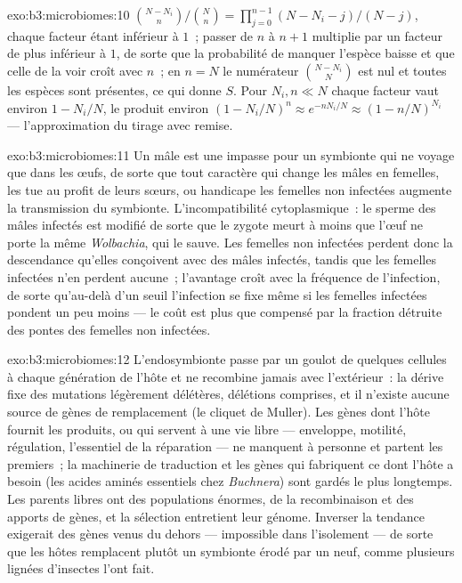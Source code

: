 \begin{solution}{exo:b3:microbiomes:10}
$\binom{N-N_{i}}{n}/\binom{N}{n} = \prod_{j=0}^{n-1}(N - N_{i} - j)/(N -
j)$, chaque facteur étant inférieur à $1$~; passer de $n$ à $n + 1$
multiplie par un facteur de plus inférieur à $1$, de sorte que la
probabilité de manquer l'espèce baisse et que celle de la voir croît
avec $n$~; en $n = N$ le numérateur $\binom{N -
N_{i}}{N}$ est nul et toutes les espèces sont présentes, ce qui donne
$S$. Pour $N_{i},
n \ll N$ chaque facteur vaut environ $1 - N_{i}/N$, le produit environ
$(1 -
N_{i}/N)^{n} \approx e^{-nN_{i}/N} \approx (1 - n/N)^{N_{i}}$ ---
l'approximation du tirage avec remise.
\end{solution}

\begin{solution}{exo:b3:microbiomes:11}
Un mâle est une impasse pour un symbionte qui ne voyage que dans les
œufs, de sorte que tout caractère qui change les mâles en femelles, les
tue au profit de leurs sœurs, ou handicape les femelles non infectées
augmente la transmission du symbionte. L'incompatibilité
cytoplasmique~: le sperme des mâles infectés est modifié de sorte que le
zygote meurt à moins que l'œuf ne porte la même \emph{Wolbachia}, qui
le sauve. Les femelles non infectées perdent donc la descendance
qu'elles conçoivent avec des mâles infectés, tandis que les femelles
infectées n'en perdent aucune~; l'avantage croît avec la fréquence de
l'infection, de sorte qu'au-delà d'un seuil l'infection se fixe même si
les femelles infectées pondent un peu moins --- le coût est plus que
compensé par la fraction détruite des pontes des femelles non
infectées.
\end{solution}

\begin{solution}{exo:b3:microbiomes:12}
L'endosymbionte passe par un goulot de quelques cellules à chaque
génération de l'hôte et ne recombine jamais avec l'extérieur~: la
dérive fixe des mutations légèrement délétères, délétions comprises, et
il n'existe aucune source de gènes de remplacement (le cliquet de
Muller). Les gènes dont l'hôte fournit les produits, ou qui servent à
une vie libre --- enveloppe, motilité, régulation, l'essentiel de la
réparation --- ne manquent à personne et partent les premiers~; la
machinerie de traduction et les gènes qui fabriquent ce dont l'hôte a
besoin (les acides aminés essentiels chez \emph{Buchnera}) sont gardés
le plus longtemps. Les parents libres ont des populations énormes, de
la recombinaison et des apports de gènes, et la sélection entretient
leur génome. Inverser la tendance exigerait des gènes venus du dehors
--- impossible dans l'isolement --- de sorte que les hôtes remplacent
plutôt un symbionte érodé par un neuf, comme plusieurs lignées
d'insectes l'ont fait.
\end{solution}

